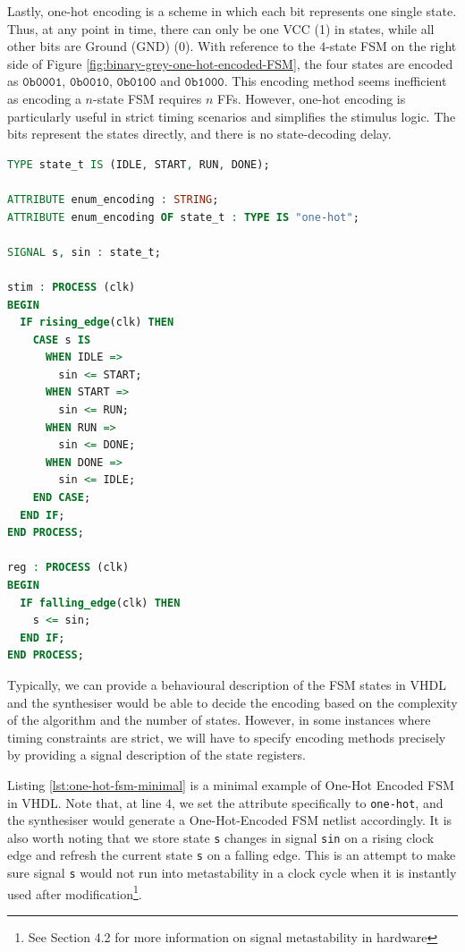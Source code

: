 \documentclass[a4paper]{report}
\newcommand{\proglang}{\textsf}
\newcommand{\code}{\texttt}
\begin{document}
Lastly, one-hot encoding is a scheme in which each bit represents one single state. Thus, at any point in time, there can only be one VCC (1) in states, while all other bits are Ground (GND) (0). With reference to the $4$-state FSM on the right side of Figure \ref{fig:binary-grey-one-hot-encoded-FSM}, the four states are encoded as $\mathtt{0b0001}$, $\mathtt{0b0010}$,  $\mathtt{0b0100}$ and $\mathtt{0b1000}$. This encoding method seems inefficient as encoding a $n$-state FSM requires $n$ FFs. However, one-hot encoding is particularly useful in strict timing scenarios and simplifies the stimulus logic. The bits represent the states directly, and there is no state-decoding delay.

\begin{lstlisting}[language=VHDL, caption=One-Hot Encoded FSM Minimal Example in \proglang{VHDL}, label={lst:one-hot-fsm-minimal}]
TYPE state_t IS (IDLE, START, RUN, DONE);

ATTRIBUTE enum_encoding : STRING;
ATTRIBUTE enum_encoding OF state_t : TYPE IS "one-hot";

SIGNAL s, sin : state_t;

stim : PROCESS (clk)
BEGIN
  IF rising_edge(clk) THEN
    CASE s IS
      WHEN IDLE =>
        sin <= START;
      WHEN START =>
        sin <= RUN;
      WHEN RUN =>
        sin <= DONE;
      WHEN DONE =>
        sin <= IDLE;
    END CASE;
  END IF;
END PROCESS;

reg : PROCESS (clk)
BEGIN
  IF falling_edge(clk) THEN
    s <= sin;
  END IF;
END PROCESS;
\end{lstlisting}

Typically, we can provide a behavioural description of the FSM states in \proglang{VHDL} and the synthesiser would be able to decide the encoding based on the complexity of the algorithm and the number of states. However, in some instances where timing constraints are strict, we will have to specify encoding methods precisely by providing a signal description of the state registers.

Listing \ref{lst:one-hot-fsm-minimal} is a minimal example of One-Hot Encoded FSM in \proglang{VHDL}. Note that, at line $4$, we set the attribute specifically to \code{one-hot}, and the synthesiser would generate a One-Hot-Encoded FSM netlist accordingly. It is also worth noting that we store state \code{s} changes in signal \code{sin} on a rising clock edge and refresh the current state \code{s} on a falling edge. This is an attempt to make sure signal \code{s} would not run into metastability in a clock cycle when it is instantly used after modification\footnote{See Section 4.2 for more information on signal metastability in hardware}.
\end{document}
